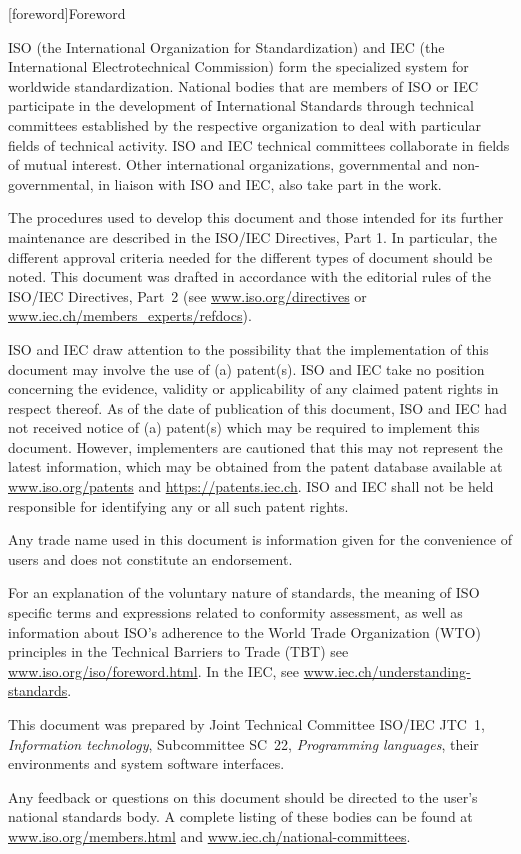 
[foreword]{Foreword}

ISO (the International Organization for Standardization) and IEC (the International Electrotechnical Commission) form the specialized system for worldwide standardization. National bodies that are members of ISO or IEC participate in the development of International Standards through technical committees established by the respective organization to deal with particular fields of technical activity. ISO and IEC technical committees collaborate in fields of mutual interest. Other international organizations, governmental and non-governmental, in liaison with ISO and IEC, also take part in the work.

The procedures used to develop this document and those intended for its further maintenance are described in the ISO/IEC Directives, Part 1. In particular, the different approval criteria needed for the different types of document should be noted. This document was drafted in accordance with the editorial rules of the ISO/IEC Directives, Part 2 (see \url{www.iso.org/directives} or \url{www.iec.ch/members_experts/refdocs}).

ISO and IEC draw attention to the possibility that the implementation of this document may involve the use of (a) patent(s). ISO and IEC take no position concerning the evidence, validity or applicability of any claimed patent rights in respect thereof. As of the date of publication of this document, ISO and IEC had not received notice of (a) patent(s) which may be required to implement this document. However, implementers are cautioned that this may not represent the latest information, which may be obtained from the patent database available at \url{www.iso.org/patents} and \url{https://patents.iec.ch}. ISO and IEC shall not be held responsible for identifying any or all such patent rights.

Any trade name used in this document is information given for the convenience of users and does not constitute an endorsement.

For an explanation of the voluntary nature of standards, the meaning of ISO specific terms and expressions related to conformity assessment, as well as information about ISO's adherence to the World Trade Organization (WTO) principles in the Technical Barriers to Trade (TBT) see \url{www.iso.org/iso/foreword.html}. In the IEC, see \url{www.iec.ch/understanding-standards}.

This document was prepared by Joint Technical Committee ISO/IEC JTC 1, \emph{Information technology}, Subcommittee SC 22, \emph{Programming languages}, their environments and system software interfaces.

Any feedback or questions on this document should be directed to the user’s national standards body. A complete listing of these bodies can be found at \url{www.iso.org/members.html} and \url{www.iec.ch/national-committees}.
